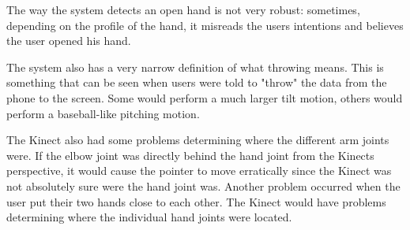 The way the system detects an open hand is not very robust: sometimes, depending on the profile of the hand, it misreads the users intentions and believes the user opened his hand. 

The system also has a very narrow definition of what throwing means. 
This is something that can be seen when users were told to "throw" the data from the phone to the screen.
Some would perform a much larger tilt motion, others would perform a baseball-like pitching motion. 

The Kinect also had some problems determining where the different arm joints were.
If the elbow joint was directly behind the hand joint from the Kinects perspective, it would cause the pointer to move erratically since the Kinect was not absolutely sure were the hand joint was.
Another problem occurred when the user put their two hands close to each other. 
The Kinect would have problems determining where the individual hand joints were located. 
